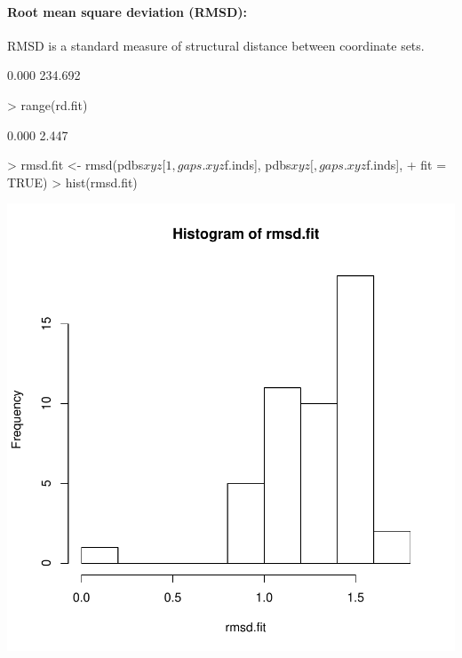 \documentclass[a4paper]{article}
\begin{document}
\paragraph{Root mean square deviation (RMSD):}
RMSD is a standard measure of structural distance between coordinate sets.
\begin{Schunk}
\begin{Soutput}
[1]   0.000 234.692
\end{Soutput}
\begin{Sinput}
> range(rd.fit)
\end{Sinput}
\begin{Soutput}
[1] 0.000 2.447
\end{Soutput}
\end{Schunk}

\begin{center}
\begin{Schunk}
\begin{Sinput}
> rmsd.fit <- rmsd(pdbs$xyz[1, gaps.xyz$f.inds], pdbs$xyz[, gaps.xyz$f.inds], 
+     fit = TRUE)
> hist(rmsd.fit)
\end{Sinput}
\end{Schunk}
\includegraphics{figs/fig-023}
\end{center}
\end{document}
